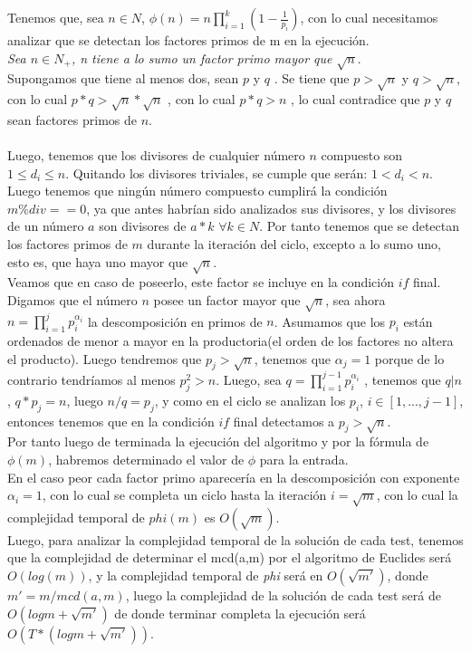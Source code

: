 \documentclass[12pt]{article}
\begin{document}
 Tenemos que, sea $n\in N$, $\phi(n) = n  \prod\limits_{i=1}^{k} (1 - \frac{1}{p_i})$, 
 con lo cual necesitamos analizar que se detectan los factores primos de m en la ejecuci\'on.\\
 \textit{Sea $n\in N_+$,  n tiene a lo sumo un factor primo mayor que $\sqrt{n}$}.\\
 Supongamos que tiene al menos dos, sean $p$ y $q$ . Se tiene que $p > \sqrt{n}$ y $q > \sqrt{n}$, con lo cual
  $p*q> \sqrt{n} *\sqrt{n}$ , con lo cual $p*q > n$ , lo cual contradice que $p$ y $q$ sean factores primos de $n$.\\
\\
Luego, tenemos que los divisores de cualquier n\'umero $n$ compuesto son $1\leq d_i\leq n$. Quitando los divisores triviales, se cumple que ser\'an: 
$1<d_i<n$. 
Luego tenemos que ning\'un n\'umero compuesto cumplir\'a la condici\'on \textit{$m\%div==0$},
ya que antes habr\'ian sido analizados sus divisores, y los divisores de un n\'umero $a$ son divisores de $a*k$ $\forall k\in N$. Por tanto tenemos que se detectan los factores primos de $m$ durante la 
iteraci\'on del ciclo, excepto a lo sumo uno, esto es, que haya uno mayor que $\sqrt{n}$.\\

Veamos que en caso de poseerlo, este factor se incluye en la condici\'on $if$ final. Digamos que el n\'umero $n$ posee un factor mayor que 
$\sqrt{n}$, sea ahora $n = \prod\limits_{i=1}^{j} p_{i}^{\alpha_i}$ la descomposici\'on en primos de $n$. Asumamos que los $p_i$ est\'an 
ordenados de menor a mayor en la productoria(el orden de los factores no altera el producto). Luego tendremos que 
$p_j > \sqrt{n}$, 
tenemos que $\alpha_j = 1$ porque de lo contrario tendr\'iamos al menos $p_{j}^{2} > n$. Luego, sea 
$q = \prod\limits_{i=1}^{j-1} p_{i}^{\alpha_i}$ , tenemos que $q|n$, $q*p_j=n$, luego $n/q = p_j$, y como en el ciclo se analizan los 
$p_i$, $i\in [1,...,j-1]$, entonces tenemos que en la condici\'on $if$ final detectamos a $p_j>\sqrt{n}$.\\
Por tanto luego de terminada la ejecuci\'on del algoritmo y por la f\'ormula de $\phi(m)$, habremos determinado el valor de $\phi$ para la 
entrada.\\
En el caso peor cada factor primo aparecer\'ia en la descomposici\'on con exponente $\alpha_i=1$, con lo cual se completa un ciclo hasta la 
iteraci\'on $i = \sqrt{m}$, con lo cual la complejidad temporal de $phi(m)$ es $O(\sqrt{m})$.\\
Luego, para analizar la complejidad temporal de la soluci\'on de cada test, tenemos que la complejidad de determinar el mcd(a,m) por el 
algoritmo de Euclides ser\'a $O(log(m))$, y la complejidad temporal de \textit{phi} ser\'a en $O(\sqrt{m'})$, donde $m' = m/mcd(a,m)$, luego
 la complejidad de la soluci\'on de cada test ser\'a de $O(logm + \sqrt{m'})$ de donde terminar completa la ejecuci\'on ser\'a 
$O(T*(log m + \sqrt{m'}))$.\\
\end{document}
